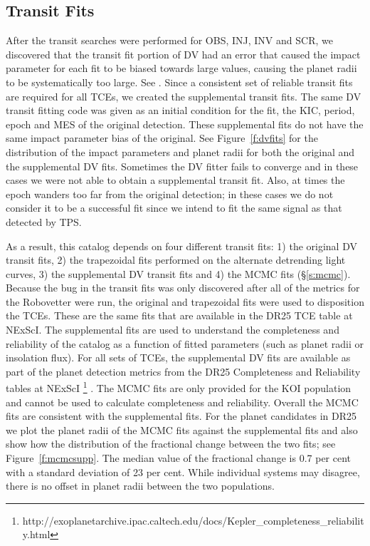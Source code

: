 \subsection{Transit Fits}

After the transit searches were performed for OBS, INJ, INV and SCR, we discovered that the transit fit portion of DV had an error that caused the impact parameter for each fit to be biased towards large values, causing the planet radii to be systematically too large. See \citet{KSCI19110}. Since a consistent set of reliable transit fits are required for all TCEs, we created the supplemental transit fits.  The same DV transit fitting code was given as an initial condition for the fit, the KIC, period, epoch and MES of the original detection. These supplemental fits do not have the same impact parameter bias of the original. See Figure~\ref{f:dvfits} for the distribution of the impact parameters and planet radii for both the original and the supplemental DV fits.  Sometimes the DV fitter fails to converge and in these cases we were not able to obtain a supplemental transit fit. Also, at times the epoch wanders too far from the original detection; in these cases we do not consider it to be a successful fit since we intend to fit the same signal as that detected by TPS.

As a result, this catalog depends on four different transit fits: 1) the original DV transit fits, 2) the trapezoidal fits performed on the alternate detrending light curves, 3) the supplemental DV transit fits and 4) the MCMC fits (\S\ref{s:mcmc}).  Because the bug in the transit fits was only discovered after all of the metrics for the Robovetter were run, the original and trapezoidal fits were used to disposition the TCEs. These are the same fits that are available in the DR25 TCE table at NExScI.  The supplemental fits are used to understand the completeness and reliability of the catalog as a function of fitted parameters (such as planet radii or insolation flux).  For all sets of TCEs, the supplemental DV fits are available as part of the planet detection metrics from the DR25 Completeness and Reliability tables at NExScI \footnote{http://exoplanetarchive.ipac.caltech.edu/docs/Kepler\_completeness\_reliability.html}  \citep{KSCI19110,KSCI19114}. The MCMC fits are only provided for the KOI population and cannot be used to calculate completeness and reliability. Overall the MCMC fits are consistent with the supplemental fits.  For the planet candidates in DR25 we plot the planet radii of the MCMC fits against the supplemental fits and also show how the distribution of the fractional change between the two fits; see Figure~\ref{f:mcmcsupp}. The median value of the fractional change is 0.7 per cent with a standard deviation of 23 per cent. While individual systems may disagree, there is no offset in planet radii between the two populations.  

